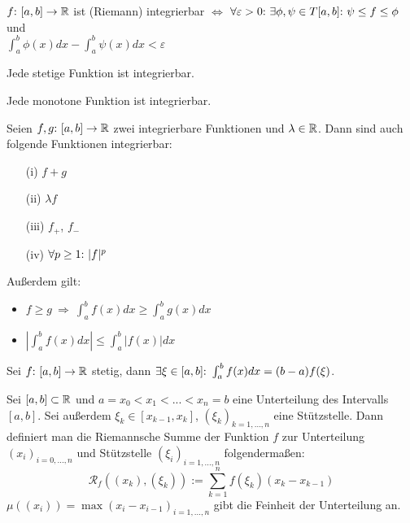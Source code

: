 \begin{framedthm}
	$f{:}\  [a,b] \to \mathbb{R}$ ist (Riemann) integrierbar $\iff$ $\forall \varepsilon > 0{:}\  \exists \phi,\psi \in T[a,b]{:}\  \psi \leq f \leq \phi$ und\\
	$\int_{a}^{b} \phi(x)dx - \int_{a}^{b} \psi(x)dx < \varepsilon$
\end{framedthm}

\begin{framedthm}
	Jede stetige Funktion ist integrierbar.
\end{framedthm}

\begin{framedthm}
	Jede monotone Funktion ist integrierbar.
\end{framedthm}

\begin{framedthm}
	Seien $f,g{:}\  [a,b] \to \mathbb{R}$ zwei integrierbare Funktionen und $\lambda \in \mathbb{R}$. Dann sind auch folgende Funktionen integrierbar:
	\begin{enumerate}
		\item [(i)] $f+g$
		\item [(ii)] $\lambda f$
		\item [(iii)] $f_+$, $f_{-}$
		\item [(iv)] $\forall p \geq 1{:}\  |f|^p$
	\end{enumerate}
	Außerdem gilt:
	\begin{itemize}
		\item $f \geq g \ \Rightarrow \ \int_{a}^{b} f(x) dx \geq \int_{a}^{b} g(x) dx$
		\item $|\int_{a}^{b} f(x) dx| \leq \int_{a}^{b} |f(x)| dx $
	\end{itemize}
\end{framedthm}

\begin{framedthm}
	Sei $f{:}\ [a,b] \to \mathbb{R}$ stetig, dann  $\exists \xi \in [a,b]{:}\  \int_{a}^{b} f(x)dx = (b-a)f(\xi)$.
\end{framedthm}

\begin{frameddefn}
	Sei $[a,b] \subset \mathbb{R}$ und $a=x_0 < x_1 < ... < x_n = b$ eine Unterteilung des Intervalls $[a,b]$. Sei außerdem $\xi_k \in [x_{k-1}, x_k]$, $(\xi_k)_{k=1,...,n}$ eine Stützstelle. Dann definiert man die Riemannsche Summe der Funktion $f$ zur Unterteilung $(x_i)_{i=0,...,n}$ und Stützstelle $(\xi_i)_{i=1,...,n}$ folgendermaßen:
	\[
	\mathcal{R}_f((x_k), (\xi_k)) := \sum_{k=1}^n f(\xi_k) (x_k - x_{k-1}) 
	\]
	$\mu((x_i)) = \max(x_i - x_{i-1})_{i=1,...,n}$ gibt die Feinheit der Unterteilung an.
\end{frameddefn}

